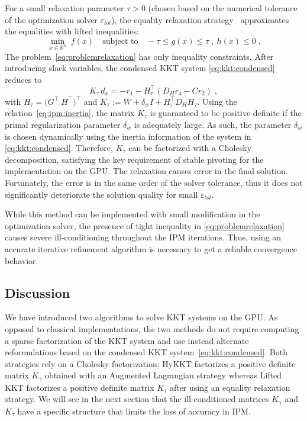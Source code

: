 For a small relaxation parameter $\tau > 0$ (chosen based on the numerical tolerance of the optimization solver
$\varepsilon_{tol}$), the equality relaxation strategy~\cite{shin2023accelerating} approximates
the equalities with lifted inequalities:
\begin{equation}
  \label{eq:problemrelaxation}
    \min_{x \in \mathbb{R}^n} \;  f(x)
\quad \text{subject to}\quad
     - \tau \leq g(x) \leq \tau \;,~  h(x) \leq 0  \; .
\end{equation}
The problem~\eqref{eq:problemrelaxation} has only inequality constraints.
After introducing slack variables, the condensed KKT system \eqref{eq:kkt:condensed} reduces to
\begin{equation}
  \label{eq:liftedkkt}
    K_\tau \,d_x = - r_1 - H_\tau^\top(D_H r_4 - C r_2) \; ,
\end{equation}
with $H_\tau = \big(G^\top ~ H^\top \big)^\top$ and
$K_\tau := W + \delta_w I + H_\tau^\top D_H H_\tau$.
Using the relation~\eqref{eq:ipm:inertia}, the matrix $K_\tau$
is guaranteed to be positive definite if the primal regularization parameter $\delta_w$ is adequately large.
As such, the parameter $\delta_w$ is chosen dynamically using the inertia information of the system in \eqref{eq:kkt:condensed}.
Therefore, $K_\tau$ can be factorized with a Cholesky decomposition, satisfying the key requirement of stable pivoting for the implementation on the GPU. The relaxation causes error in the final solution.
Fortunately, the error is in the same order of the solver tolerance, thus it does not significantly deteriorate the solution quality for small $\varepsilon_{tol}$.

While this method can be implemented with small modification in the optimization solver, the presence of tight inequality in \eqref{eq:problemrelaxation} causes severe ill-conditioning throughout the IPM iterations. Thus,
using an accurate iterative refinement algorithm is necessary to get a reliable convergence behavior.

\subsection{Discussion}
We have introduced two algorithms to solve
KKT systems on the GPU. As opposed to classical implementations,
the two methods do not require computing a sparse \lblt factorization of the KKT
system and use instead alternate reformulations based on the condensed KKT
system~\eqref{eq:kkt:condensed}. Both strategies
rely on a Cholesky factorization: HyKKT factorizes a positive
definite matrix $K_\gamma$ obtained with an Augmented Lagrangian strategy
whereas Lifted KKT factorizes a positive definite matrix $K_\tau$
after using an equality relaxation strategy.
We will see in the next section that the ill-conditioned matrices $K_\gamma$ and $K_\tau$
have a specific structure that limits the loss of accuracy in IPM.


